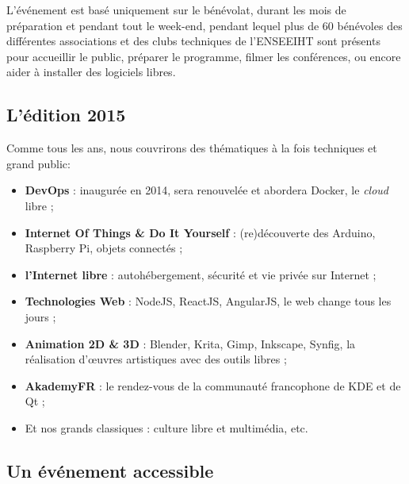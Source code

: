 \Separateur

\begin{minipage}{0.7\textwidth}
L'événement est basé uniquement sur le bénévolat, durant les mois 
de préparation et pendant tout le week-end, pendant lequel plus de 60 
bénévoles des différentes associations et des clubs techniques de l'ENSEEIHT
sont présents pour accueillir le public, préparer le 
programme, filmer les conférences, ou encore aider à installer des 
logiciels libres.
\end{minipage}
\begin{minipage}{0.3\textwidth}
\begin{center}
\end{center}
\end{minipage}

\subsection{L'édition 2015}

Comme tous les ans, nous couvrirons des thématiques à la fois techniques et grand 
public:

\begin{itemize}[label=$\bullet$]
\item \textbf{DevOps} : inaugurée en 2014, sera renouvelée et abordera Docker, le \textit{cloud} libre ;
\item \textbf{Internet Of Things \& Do It Yourself} : (re)découverte des Arduino, Raspberry Pi, objets connectés ;
\item \textbf{l’Internet libre} : autohébergement, sécurité et vie privée sur Internet ;
\item \textbf{Technologies Web} : NodeJS, ReactJS, AngularJS, le web change tous les jours ;
\item \textbf{Animation 2D \& 3D} : Blender, Krita, Gimp, Inkscape, Synfig, la réalisation d'œuvres artistiques avec des outils libres ;
\item \textbf{AkademyFR} : le rendez-vous de la communauté francophone de KDE et de Qt ;
\item Et nos grands classiques : culture libre et multimédia, etc.
\end{itemize}

\subsection{Un événement accessible}

